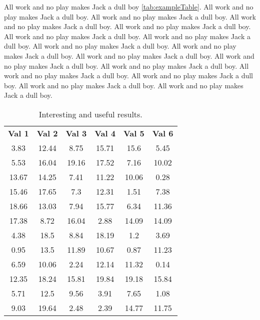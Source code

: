 \documentclass{article}
\begin{document}
All work and no play makes Jack a dull boy \autoref{tab:exampleTable}. All work and no play makes Jack a dull boy. All work and no play makes Jack a dull boy. All work and no play makes Jack a dull boy. All work and no play makes Jack a dull boy. All work and no play makes Jack a dull boy. All work and no play makes Jack a dull boy. All work and no play makes Jack a dull boy. All work and no play makes Jack a dull boy. All work and no play makes Jack a dull boy. All work and no play makes Jack a dull boy. All work and no play makes Jack a dull boy. All work and no play makes Jack a dull boy. All work and no play makes Jack a dull boy. All work and no play makes Jack a dull boy. All work and no play makes Jack a dull boy.

\begin{table}
    \begin{center}
      \caption{Interesting and useful results.}
      \label{tab:exampleTable}
      \begin{tabular}{c|c|c|c|c|c} %
        \textbf{Val 1} & \textbf{Val 2} & \textbf{Val 3} & \textbf{Val 4} & \textbf{Val 5} & \textbf{Val 6} \\
        3.83 & 12.44 & 8.75 & 15.71 & 15.6 & 5.45 \\
        5.53 & 16.04 & 19.16 & 17.52 & 7.16 & 10.02 \\
        13.67 & 14.25 & 7.41 & 11.22 & 10.06 & 0.28 \\
        15.46 & 17.65 & 7.3 & 12.31 & 1.51 & 7.38 \\
        18.66 & 13.03 & 7.94 & 15.77 & 6.34 & 11.36 \\
        17.38 & 8.72 & 16.04 & 2.88 & 14.09 & 14.09 \\
        4.38 & 18.5 & 8.84 & 18.19 & 1.2 & 3.69 \\
        0.95 & 13.5 & 11.89 & 10.67 & 0.87 & 11.23 \\
        6.59 & 10.06 & 2.24 & 12.14 & 11.32 & 0.14 \\
        12.35 & 18.24 & 15.81 & 19.84 & 19.18 & 15.84 \\
        5.71 & 12.5 & 9.56 & 3.91 & 7.65 & 1.08 \\
        9.03 & 19.64 & 2.48 & 2.39 & 14.77 & 11.75 \\
      \end{tabular}
    \end{center}
  \end{table}
\end{document}
